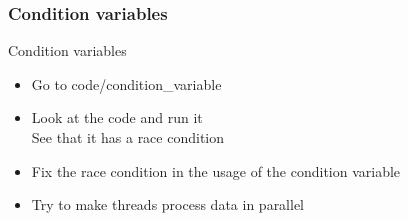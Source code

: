 \begin{frame}[fragile]
  \frametitle{Condition variables}
  \begin{exercise}{Condition variables}
    \begin{itemize}
    \item Go to code/condition\_variable
    \item Look at the code and run it\\
      See that it has a race condition
    \item Fix the race condition in the usage of the condition variable
    \item Try to make threads process data in parallel
    \end{itemize}
  \end{exercise}
\end{frame}
